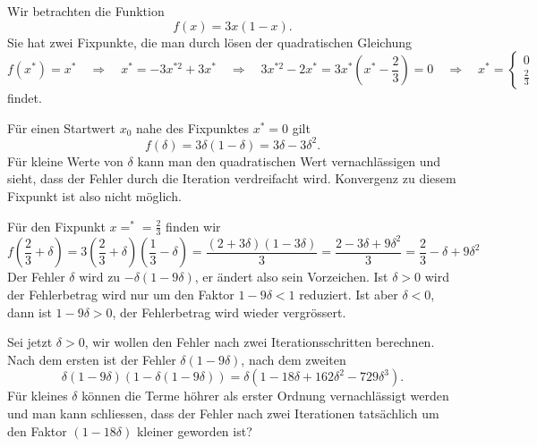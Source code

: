 \begin{beispiel}
\label{buch:beispiel:logistisch3}
Wir betrachten die Funktion
\[
f(x) = 3x(1-x).
\]
Sie hat zwei Fixpunkte, die man durch lösen der quadratischen
Gleichung
\[
f(x^*)=x^*
\quad\Rightarrow\quad
x^*=-3x^{*2}+3x^*
\quad\Rightarrow\quad
3x^{*2}-2x^*=3x^*(x^*-{\textstyle\frac23})=0
\quad\Rightarrow\quad
x^*=
\begin{cases}
0      &\\
\frac23&
\end{cases}
\]
findet.

Für einen Startwert $x_0$ nahe des Fixpunktes $x^*=0$ gilt
\[
f(\delta)
=
3\delta(1-\delta)
=
3\delta - 3\delta^2.
\]
Für kleine Werte von $\delta$ kann man den quadratischen Wert vernachlässigen
und sieht, dass der Fehler durch die Iteration verdreifacht wird.
Konvergenz zu diesem Fixpunkt ist also nicht möglich.

Für den Fixpunkt $x=^* = \frac23$ finden wir
\begin{equation}
f({\textstyle\frac23}+\delta)
=
3({\textstyle\frac23}+\delta)({\textstyle\frac13}-\delta)
=
\frac{(2+3\delta)(1-3\delta)}3
=
\frac{2-3\delta+9\delta^2}{3}
=
\frac23 - \delta  + 9\delta^2
\label{buch:equation:logistic3error}
\end{equation}
Der Fehler $\delta$ wird zu $ -\delta(1-9\delta) $, er ändert also sein
Vorzeichen.
Ist $\delta>0$ wird der Fehlerbetrag wird nur um den Faktor $1-9\delta < 1$
reduziert.
Ist aber $\delta <0$, dann ist $1-9\delta>0$, der Fehlerbetrag wird wieder
vergrössert.

Sei jetzt $\delta>0$, wir wollen den Fehler nach zwei Iterationsschritten
berechnen.
Nach dem ersten ist der Fehler $\delta(1-9\delta)$, nach dem zweiten
\[
\delta(1-9\delta)(1-\delta(1-9\delta))
=
\delta(1-18\delta + 162\delta^2-729\delta^3).
\]
Für kleines $\delta$ können die Terme höhrer als erster Ordnung
vernachlässigt werden und man kann schliessen, dass der Fehler nach
zwei Iterationen tatsächlich um den Faktor $(1-18\delta)$ kleiner
geworden ist?


\end{beispiel}

